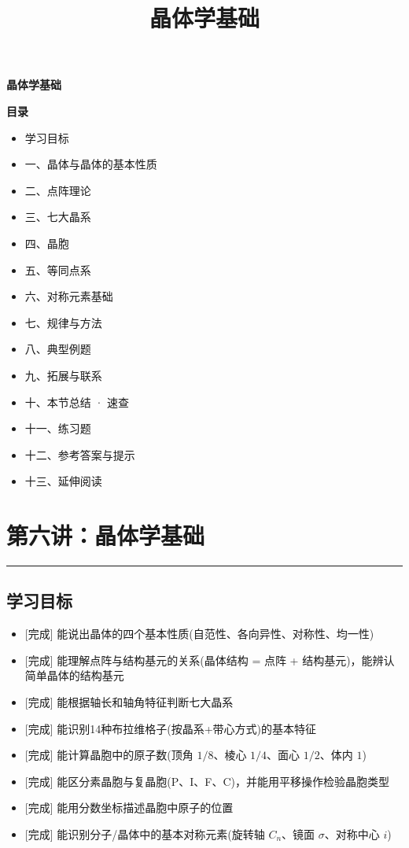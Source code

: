 \documentclass[a4paper,11pt]{ctexart}
\title{晶体学基础}
\date{}
\providecommand{\tightlist}{\setlength{\itemsep}{0pt}\setlength{\parskip}{0pt}}
\newcommand{\箭}{\ensuremath{\rightarrow}}
\newcommand{\左箭}{\ensuremath{\leftarrow}}
\newcommand{\上箭}{\ensuremath{\uparrow}}
\newcommand{\下箭}{\ensuremath{\downarrow}}
\newcommand{\衡}{\ensuremath{\rightleftharpoons}}
\newcommand{\双箭}{\ensuremath{\leftrightarrow}}
\newcommand{\约等于}{\ensuremath{\approx}}
\newcommand{\小于等于}{\ensuremath{\leq}}
\newcommand{\大于等于}{\ensuremath{\geq}}
\newcommand{\不等于}{\ensuremath{\neq}}
\newcommand{\西格马}{\ensuremath{\sigma}}
\newcommand{\派}{\ensuremath{\pi}}
\begin{document}
\thispagestyle{plain}
\begin{center}
{\bfseries 晶体学基础\par}
\end{center}
\vspace{1em}
{\large\bfseries 目录\par}
\vspace{0.6em}
\begin{itemize}[leftmargin=1.6em,label={},itemsep=0.3em,topsep=0.2em]
\item 学习目标
\item 一、晶体与晶体的基本性质
\item 二、点阵理论
\item 三、七大晶系
\item 四、晶胞
\item 五、等同点系
\item 六、对称元素基础
\item 七、规律与方法
\item 八、典型例题
\item 九、拓展与联系
\item 十、本节总结 · 速查
\item 十一、练习题
\item 十二、参考答案与提示
\item 十三、延伸阅读
\end{itemize}
\vspace{0.4em}
\newpage
\section{第六讲：晶体学基础}\label{ux7b2cux516dux8bb2ux6676ux4f53ux5b66ux57faux7840}

\begin{center}\rule{0.5\linewidth}{0.5pt}\end{center}

\subsection{学习目标}\label{ux5b66ux4e60ux76eeux6807}

\begin{itemize}
\tightlist
\item
  {[}完成{]} 能说出晶体的四个基本性质(自范性、各向异性、对称性、均一性)
\item
  {[}完成{]} 能理解点阵与结构基元的关系(晶体结构 = 点阵 + 结构基元)，能辨认简单晶体的结构基元
\item
  {[}完成{]} 能根据轴长和轴角特征判断七大晶系
\item
  {[}完成{]} 能识别14种布拉维格子(按晶系+带心方式)的基本特征
\item
  {[}完成{]} 能计算晶胞中的原子数(顶角 \(1/8\)、棱心 \(1/4\)、面心 \(1/2\)、体内 \(1\))
\item
  {[}完成{]} 能区分素晶胞与复晶胞(P、I、F、C)，并能用平移操作检验晶胞类型
\item
  {[}完成{]} 能用分数坐标描述晶胞中原子的位置
\item
  {[}完成{]} 能识别分子/晶体中的基本对称元素(旋转轴 \(C_n\)、镜面 \(\sigma\)、对称中心 \(i\))
\end{itemize}
\end{document}
